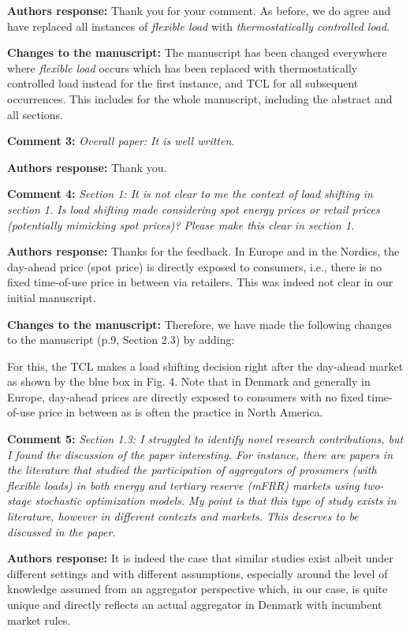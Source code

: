 \documentclass[10pt]{article}
\newcounter{models}
\newcommand{\nt}[1]{\textcolor{newtextcolor}{#1}}
\newcommand{\auth}{\textbf{Authors response: }}
\newcommand{\changes}{\textbf{Changes to the manuscript: }}
\begin{document}
\auth Thank you for your comment. As before, we do agree and have replaced all instances of \textit{flexible load} with \textit{thermostatically controlled load}.

\changes The manuscript has been changed everywhere where \textit{flexible load} occurs which has been replaced with \nt{thermostatically controlled load} instead for the first instance, and \nt{TCL} for all subsequent occurrences. This includes for the whole manuscript, including the abstract and all sections.

\textbf{Comment 3:} \textit{Overall paper: It is well written.}

\auth Thank you.

\textbf{Comment 4:} \textit{Section 1: It is not clear to me the context of load shifting in section 1. Is load shifting made considering spot energy prices or retail prices (potentially mimicking spot prices)? Please make this clear in section 1.}

\auth Thanks for the feedback. In Europe and in the Nordics, the day-ahead price (spot price) is directly exposed to consumers, i.e., there is no fixed time-of-use price in between via retailers. This was indeed not clear in our initial manuscript.

\changes Therefore, we have made the following changes to the manuscript (p.9, Section 2.3) by adding:

\nt{For this, the TCL makes a load shifting decision right after the day-ahead market as shown by the blue box in Fig. 4. Note that in Denmark and generally in Europe, day-ahead prices are directly exposed to consumers with no fixed time-of-use price in between as is often the practice in North America.}

\textbf{Comment 5:} \textit{Section 1.3: I struggled to identify novel research contributions, but I found the discussion of the paper interesting. For instance, there are papers in the literature that studied the participation of aggregators of prosumers (with flexible loads) in both energy and tertiary reserve (mFRR) markets using two-stage stochastic optimization models. My point is that this type of study exists in literature, however in different contexts and markets. This deserves to be discussed in the paper.}

\auth It is indeed the case that similar studies exist albeit under different settings and with different assumptions, especially around the level of knowledge assumed from an aggregator perspective which, in our case, is quite unique and directly reflects an actual aggregator in Denmark with incumbent market rules.
\end{document}
